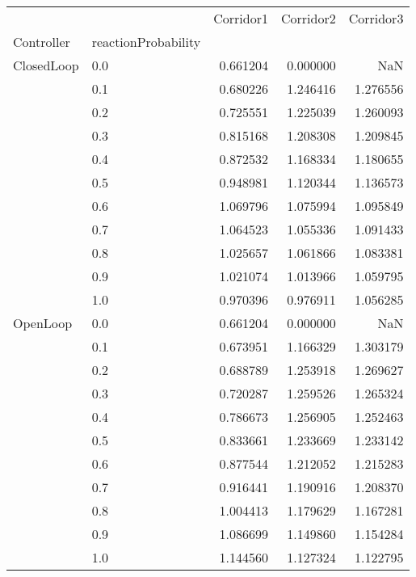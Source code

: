 \begin{tabular}{llrrr}
\toprule
         &     &  Corridor1 &  Corridor2 &  Corridor3 \\
Controller & reactionProbability &            &            &            \\
\midrule
ClosedLoop & 0.0 &   0.661204 &   0.000000 &        NaN \\
         & 0.1 &   0.680226 &   1.246416 &   1.276556 \\
         & 0.2 &   0.725551 &   1.225039 &   1.260093 \\
         & 0.3 &   0.815168 &   1.208308 &   1.209845 \\
         & 0.4 &   0.872532 &   1.168334 &   1.180655 \\
         & 0.5 &   0.948981 &   1.120344 &   1.136573 \\
         & 0.6 &   1.069796 &   1.075994 &   1.095849 \\
         & 0.7 &   1.064523 &   1.055336 &   1.091433 \\
         & 0.8 &   1.025657 &   1.061866 &   1.083381 \\
         & 0.9 &   1.021074 &   1.013966 &   1.059795 \\
         & 1.0 &   0.970396 &   0.976911 &   1.056285 \\
OpenLoop & 0.0 &   0.661204 &   0.000000 &        NaN \\
         & 0.1 &   0.673951 &   1.166329 &   1.303179 \\
         & 0.2 &   0.688789 &   1.253918 &   1.269627 \\
         & 0.3 &   0.720287 &   1.259526 &   1.265324 \\
         & 0.4 &   0.786673 &   1.256905 &   1.252463 \\
         & 0.5 &   0.833661 &   1.233669 &   1.233142 \\
         & 0.6 &   0.877544 &   1.212052 &   1.215283 \\
         & 0.7 &   0.916441 &   1.190916 &   1.208370 \\
         & 0.8 &   1.004413 &   1.179629 &   1.167281 \\
         & 0.9 &   1.086699 &   1.149860 &   1.154284 \\
         & 1.0 &   1.144560 &   1.127324 &   1.122795 \\
\bottomrule
\end{tabular}
